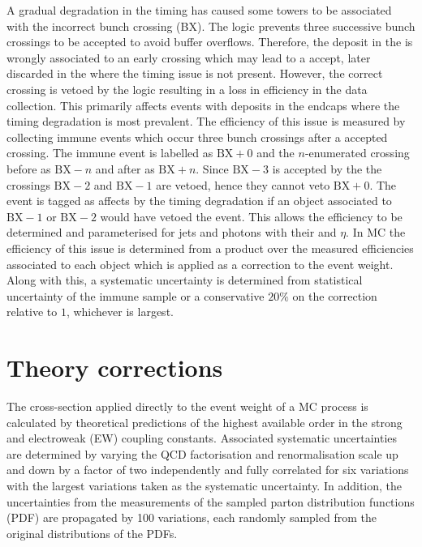 A gradual degradation in the \ECAL timing has caused some \HWT \ECAL towers to
be associated with the incorrect bunch crossing (BX). The \HWT logic prevents
three successive bunch crossings to be accepted to avoid buffer overflows.
Therefore, the deposit in the \ECAL is wrongly associated to an early crossing
which may lead to a \HWT accept, later discarded in the \SWT where the timing
issue is not present. However, the correct crossing is vetoed by the \HWT
logic resulting in a loss in efficiency in the data collection. This primarily
affects events with \ECAL deposits in the endcaps where the timing degradation
is most prevalent. The efficiency of this issue is measured by collecting
immune events which occur three bunch crossings after a \HWT accepted
crossing. The immune event is labelled as $\mathrm{BX}+0$ and the
$n$-enumerated crossing before as $\mathrm{BX}-n$ and after as
$\mathrm{BX}+n$. Since $\mathrm{BX}-3$ is accepted by the \HWT the crossings
$\mathrm{BX}-2$ and $\mathrm{BX}-1$ are vetoed, hence they cannot veto
$\mathrm{BX}+0$. The event is tagged as affects by the timing degradation if
an \HWT object associated to $\mathrm{BX}-1$ or $\mathrm{BX}-2$ would have
vetoed the event. This allows the efficiency to be determined and
parameterised for jets and photons with their \pt and $\eta$. In MC the
efficiency of this issue is determined from a product over the measured
efficiencies associated to each object which is applied as a correction to the
event weight. Along with this, a systematic uncertainty is determined from
statistical uncertainty of the immune sample or a conservative $20\%$ on the
correction relative to $1$, whichever is largest.


\section{Theory corrections}

The cross-section applied directly to the event weight of a MC process is
calculated by theoretical predictions of the highest available order in the
strong and electroweak (EW) coupling constants. Associated systematic
uncertainties are determined by varying the QCD factorisation and
renormalisation scale up and down by a factor of two independently and fully
correlated for six variations with the largest variations taken as the
systematic uncertainty. In addition, the uncertainties from the measurements
of the sampled \NNPDF parton distribution functions (PDF) \cite{Ball:2014uwa}
are propagated by 100 variations, each randomly sampled from the original
distributions of the PDFs.

